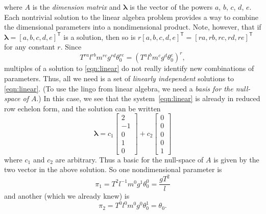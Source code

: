 \documentclass[reqno]{immbook}
\numberwithin{equation}{chapter}
\numberwithin{question}{section}
\numberwithin{theorem}{chapter}
\numberwithin{figure}{chapter}
\theoremstyle{definition}
\begin{document}
where $A$ is the \emph{dimension matrix}
and  $\pmb{\lambda}$ is the vector of the powers
$a$, $b$, $c$, $d$, $e$.
Each nontrivial solution to the
linear algebra problem provides a way
to combine the dimensional parameters
into a nondimensional product.
Note, however, that if
$\pmb{\lambda} = \left[a,b,c,d,e\right]^{\textsf{T}}$ is a solution,
then so is $r\left[a,b,c,d,e\right]^{\textsf{T}} = \left[ra,rb,rc,rd,re\right]^{\textsf{T}}$
for any constant $r$.
Since
\begin{equation}
  T^{ra}l^{rb} m^{rc} g^{rd} \theta_0^{re}
   = \left(T^a l^b m^c g^d \theta_0^e\right)^r ,
\end{equation}
multiples of a solution to \eqref{eqn:linear}
do not really identify new combinations of
parameters.
Thus, all we need is a set of
\emph{linearly independent} solutions
to \eqref{eqn:linear}.
(To use the lingo from linear algebra, we need
a \emph{basis for the null-space of $A$}.)
In this case, we see that the system~\eqref{eqn:linear}
is already in reduced row echelon form, and
the solution can be written
\begin{equation}
  \pmb{\lambda} = c_1\begin{bmatrix} 2 \\ -1 \\ 0 \\ 1 \\ 0 \end{bmatrix} +
      c_2 \begin{bmatrix} 0 \\ 0 \\ 0 \\ 0 \\ 1 \end{bmatrix} 
\end{equation}
where $c_1$ and $c_2$ are arbitrary.  Thus a basic for the
null-space of $A$ is
given by the two vector in the above solution.
So one nondimensional parameter is
\begin{equation}
   \pi_1 = T^2 l^{-1} m^0 g^1 \theta_0^0
         = \frac{gT^2}{l}
\end{equation}
and another (which we already knew) is
\begin{equation}
   \pi_2 = T^0 l^0 m^0 g^0 \theta_0^1
         = \theta_0 .
\end{equation}
\end{document}
